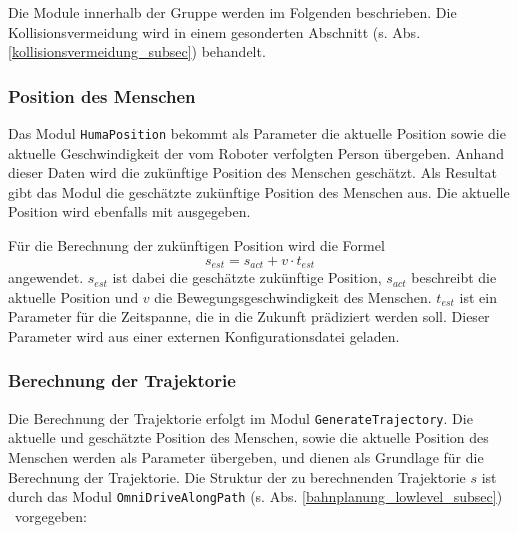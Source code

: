 Die Module innerhalb der Gruppe werden im Folgenden beschrieben.
Die Kollisionsvermeidung wird in einem gesonderten Abschnitt (s. Abs. \ref{kollisionsvermeidung_subsec}) behandelt.



\subsubsection{Position des Menschen}


Das Modul \lstinline{HumaPosition} bekommt als Parameter die aktuelle Position sowie die aktuelle Geschwindigkeit der vom Roboter verfolgten Person übergeben.
Anhand dieser Daten wird die zukünftige Position des Menschen geschätzt.
Als Resultat gibt das Modul die geschätzte zukünftige Position des Menschen aus.
Die aktuelle Position wird ebenfalls mit ausgegeben.

Für die Berechnung der zukünftigen Position wird die Formel
\begin{equation}
	s_{est} = s_{act} + v \cdot t_{est}
\end{equation}
angewendet.
$s_{est}$ ist dabei die geschätzte zukünftige Position, $s_{act}$ beschreibt die aktuelle Position und $v$ die Bewegungsgeschwindigkeit des Menschen.
$t_{est}$ ist ein Parameter für die Zeitspanne, die in die Zukunft prädiziert werden soll.
Dieser Parameter wird aus einer externen Konfigurationsdatei geladen.


\subsubsection{Berechnung der Trajektorie}

Die Berechnung der Trajektorie erfolgt im Modul \lstinline{GenerateTrajectory}.
Die aktuelle und geschätzte Position des Menschen, sowie die aktuelle Position des Menschen werden als Parameter übergeben, und dienen als Grundlage für die Berechnung der Trajektorie.
Die Struktur der zu berechnenden Trajektorie $s$ ist durch das Modul \lstinline{OmniDriveAlongPath} (s. Abs. \ref{bahnplanung_lowlevel_subsec}) \ vorgegeben:

